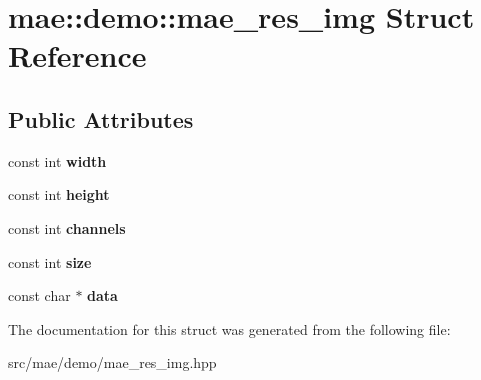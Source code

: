 \hypertarget{structmae_1_1demo_1_1mae__res__img}{\section{mae\-:\-:demo\-:\-:mae\-\_\-res\-\_\-img Struct Reference}
\label{structmae_1_1demo_1_1mae__res__img}
}
\subsection*{Public Attributes}
\begin{DoxyCompactItemize}
\item 
\hypertarget{structmae_1_1demo_1_1mae__res__img_a980d7d56c6e4efef84673bb5e744265d}{const int {\bfseries width}}\label{structmae_1_1demo_1_1mae__res__img_a980d7d56c6e4efef84673bb5e744265d}

\item 
\hypertarget{structmae_1_1demo_1_1mae__res__img_a68fc75e47688d1124e7365aa763a8ef1}{const int {\bfseries height}}\label{structmae_1_1demo_1_1mae__res__img_a68fc75e47688d1124e7365aa763a8ef1}

\item 
\hypertarget{structmae_1_1demo_1_1mae__res__img_adb75693f164caa6ea570d89fe645afda}{const int {\bfseries channels}}\label{structmae_1_1demo_1_1mae__res__img_adb75693f164caa6ea570d89fe645afda}

\item 
\hypertarget{structmae_1_1demo_1_1mae__res__img_ac19f04bfeb19e76c395da04ded0ca345}{const int {\bfseries size}}\label{structmae_1_1demo_1_1mae__res__img_ac19f04bfeb19e76c395da04ded0ca345}

\item 
\hypertarget{structmae_1_1demo_1_1mae__res__img_ab5a82dec09e0afc1089f700138d9520f}{const char $\ast$ {\bfseries data}}\label{structmae_1_1demo_1_1mae__res__img_ab5a82dec09e0afc1089f700138d9520f}

\end{DoxyCompactItemize}


The documentation for this struct was generated from the following file\-:\begin{DoxyCompactItemize}
\item 
src/mae/demo/mae\-\_\-res\-\_\-img.\-hpp\end{DoxyCompactItemize}
